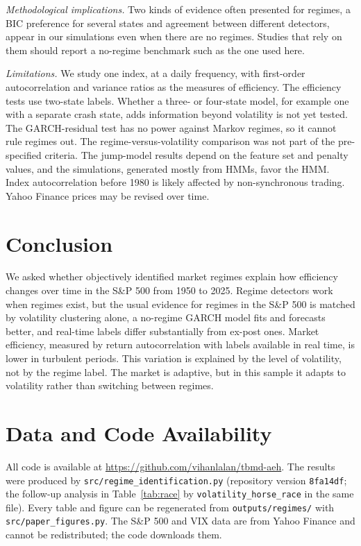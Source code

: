\documentclass[conference]{IEEEtran}
\begin{document}
\emph{Methodological implications.} Two kinds of evidence often presented for regimes, a BIC preference for several states and agreement between different detectors, appear in our simulations even when there are no regimes. Studies that rely on them should report a no-regime benchmark such as the one used here.

\emph{Limitations.} We study one index, at a daily frequency, with first-order autocorrelation and variance ratios as the measures of efficiency. The efficiency tests use two-state labels. Whether a three- or four-state model, for example one with a separate crash state, adds information beyond volatility is not yet tested. The GARCH-residual test has no power against Markov regimes, so it cannot rule regimes out. The regime-versus-volatility comparison was not part of the pre-specified criteria. The jump-model results depend on the feature set and penalty values, and the simulations, generated mostly from HMMs, favor the HMM. Index autocorrelation before 1980 is likely affected by non-synchronous trading. Yahoo Finance prices may be revised over time.

\section{Conclusion}
We asked whether objectively identified market regimes explain how efficiency changes over time in the S\&P 500 from 1950 to 2025. Regime detectors work when regimes exist, but the usual evidence for regimes in the S\&P 500 is matched by volatility clustering alone, a no-regime GARCH model fits and forecasts better, and real-time labels differ substantially from ex-post ones. Market efficiency, measured by return autocorrelation with labels available in real time, is lower in turbulent periods. This variation is explained by the level of volatility, not by the regime label. The market is adaptive, but in this sample it adapts to volatility rather than switching between regimes.

\section*{Data and Code Availability}
All code is available at \url{https://github.com/vihanlalan/tbmd-aeh}. The results were produced by \texttt{src/regime\_identification.py} (repository version \texttt{8fa14df}; the follow-up analysis in Table~\ref{tab:race} by \texttt{volatility\_horse\_race} in the same file). Every table and figure can be regenerated from \texttt{outputs/regimes/} with \texttt{src/paper\_figures.py}. The S\&P 500 and VIX data are from Yahoo Finance and cannot be redistributed; the code downloads them.
\end{document}
